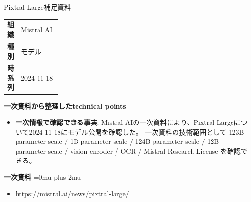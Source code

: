\begin{technicalnote}{Pixtral Large}{補足資料}
\begingroup
\begin{tabularx}{\linewidth}{@{}>{\bfseries}p{0.22\linewidth}X@{}}
組織 & Mistral AI \\
種別 & モデル \\
時系列 & 2024-11-18 \\
\end{tabularx}
\smallskip
{\bfseries 一次資料から整理したtechnical points}
\begin{itemize}[leftmargin=1.5em,itemsep=0.35em]
\item \textbf{一次情報で確認できる事実}: Mistral AIの一次資料により、Pixtral Largeについて2024-11-18にモデル公開を確認した。 一次資料の技術範囲として 123B parameter scale / 1B parameter scale / 124B parameter scale / 12B parameter scale / vision encoder / OCR / Mistral Research License を確認できる。
\end{itemize}
\begin{minipage}{\linewidth}
\begin{samepage}
{\bfseries 一次資料}
\begingroup\sloppy
\Urlmuskip=0mu plus 2mu\relax
\begin{itemize}[leftmargin=1.5em,itemsep=0.25em]
\item {\scriptsize\url{https://mistral.ai/news/pixtral-large/}}
\end{itemize}
\endgroup
\end{samepage}
\end{minipage}
\endgroup
\end{technicalnote}
\medskip
